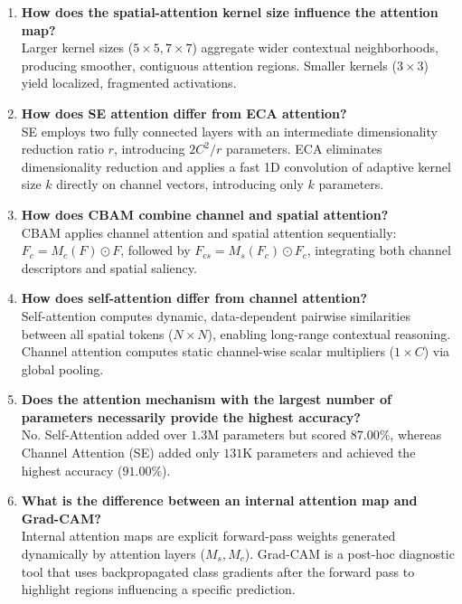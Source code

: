 \documentclass[11pt,a4paper]{article}
\begin{document}
\begin{enumerate}[label=\textbf{\arabic*.}]
    \item \textbf{How does the spatial-attention kernel size influence the attention map?} \\
    Larger kernel sizes ($5 \times 5, 7 \times 7$) aggregate wider contextual neighborhoods, producing smoother, contiguous attention regions. Smaller kernels ($3 \times 3$) yield localized, fragmented activations.

    \item \textbf{How does SE attention differ from ECA attention?} \\
    SE employs two fully connected layers with an intermediate dimensionality reduction ratio $r$, introducing $2 C^2 / r$ parameters. ECA eliminates dimensionality reduction and applies a fast 1D convolution of adaptive kernel size $k$ directly on channel vectors, introducing only $k$ parameters.

    \item \textbf{How does CBAM combine channel and spatial attention?} \\
    CBAM applies channel attention and spatial attention sequentially: $F_c = M_c(F) \odot F$, followed by $F_{cs} = M_s(F_c) \odot F_c$, integrating both channel descriptors and spatial saliency.

    \item \textbf{How does self-attention differ from channel attention?} \\
    Self-attention computes dynamic, data-dependent pairwise similarities between all spatial tokens ($N \times N$), enabling long-range contextual reasoning. Channel attention computes static channel-wise scalar multipliers ($1 \times C$) via global pooling.

    \item \textbf{Does the attention mechanism with the largest number of parameters necessarily provide the highest accuracy?} \\
    No. Self-Attention added over $1.3\text{M}$ parameters but scored $87.00\%$, whereas Channel Attention (SE) added only $131\text{K}$ parameters and achieved the highest accuracy ($91.00\%$).

    \item \textbf{What is the difference between an internal attention map and Grad-CAM?} \\
    Internal attention maps are explicit forward-pass weights generated dynamically by attention layers ($M_s, M_c$). Grad-CAM is a post-hoc diagnostic tool that uses backpropagated class gradients after the forward pass to highlight regions influencing a specific prediction.


\end{enumerate}
\end{document}
